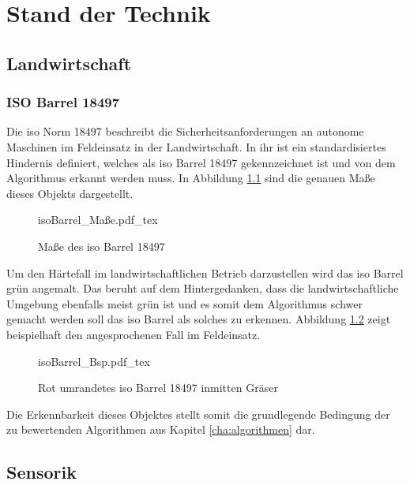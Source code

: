 \documentclass[12pt,
titlepage,
a4paper,
oneside,     %
openany,     %
listof=totoc,  %
numbers = noenddot, %
bibliography=totoc,    %
headsepline, %
]{scrbook} %
\begin{document}
\chapter{Stand der Technik}
\label{cha:sdT}

\section{Landwirtschaft}
\label{sec_landwirtschaft}

\subsection{ISO Barrel 18497}
\label{subsec_iso}

Die \ac{iso} Norm 18497 beschreibt die Sicherheitsanforderungen an autonome Maschinen im Feldeinsatz in der Landwirtschaft. In ihr ist ein standardisiertes Hindernis definiert, welches als \ac{iso} Barrel 18497 gekennzeichnet ist und von dem Algorithmus erkannt werden muss. In Abbildung \ref{fig:isoBarrel} sind die genauen Maße dieses Objekts dargestellt. \\

\begin{figure}[h]
	\centering
	\def\svgwidth{0.6\columnwidth}
	{isoBarrel_Maße.pdf_tex}
	\caption{Maße des \ac{iso} Barrel 18497}
	\label{fig:isoBarrel}
\end{figure}

Um den Härtefall im landwirtschaftlichen Betrieb darzustellen wird das \ac{iso} Barrel grün angemalt. Das beruht auf dem Hintergedanken, dass die landwirtschaftliche Umgebung ebenfalls meist grün ist und es somit dem Algorithmus schwer gemacht werden soll das \ac{iso} Barrel als solches zu erkennen. Abbildung \ref{fig:isoBarrelBsp} zeigt beispielhaft den angesprochenen Fall im Feldeinsatz. \\

\begin{figure}[h]
	\centering
	\def\svgwidth{0.8\columnwidth}
	{isoBarrel_Bsp.pdf_tex}
	\caption{Rot umrandetes \ac{iso} Barrel 18497 inmitten Gräser}
	\label{fig:isoBarrelBsp}
\end{figure}

Die Erkennbarkeit dieses Objektes stellt somit die grundlegende Bedingung der zu bewertenden Algorithmen aus Kapitel \ref{cha:algorithmen} dar.

\section{Sensorik}
\label{sec_sensorik}
\end{document}
